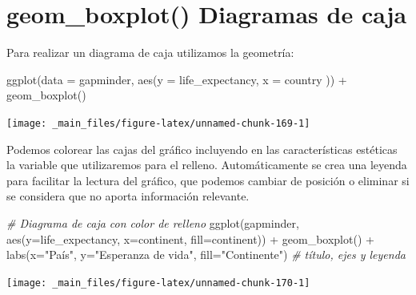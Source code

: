 \documentclass[
]{book}
\newenvironment{Shaded}{\begin{snugshade}}{\end{snugshade}}
\newcommand{\AttributeTok}[1]{\textcolor[rgb]{0.77,0.63,0.00}{#1}}
\newcommand{\CommentTok}[1]{\textcolor[rgb]{0.56,0.35,0.01}{\textit{#1}}}
\newcommand{\FunctionTok}[1]{\textcolor[rgb]{0.00,0.00,0.00}{#1}}
\newcommand{\NormalTok}[1]{#1}
\newcommand{\SpecialCharTok}[1]{\textcolor[rgb]{0.00,0.00,0.00}{#1}}
\newcommand{\StringTok}[1]{\textcolor[rgb]{0.31,0.60,0.02}{#1}}
\begin{document}
\hypertarget{geom_boxplot-diagramas-de-caja}{%
\section{geom\_boxplot() Diagramas de caja}\label{geom_boxplot-diagramas-de-caja}}

Para realizar un diagrama de caja utilizamos la geometría:

\begin{Shaded}
\begin{Highlighting}[]

\FunctionTok{ggplot}\NormalTok{(}\AttributeTok{data =}\NormalTok{ gapminder, }\FunctionTok{aes}\NormalTok{(}\AttributeTok{y =}\NormalTok{ life\_expectancy, }\AttributeTok{x =}\NormalTok{ country )) }\SpecialCharTok{+}
  \FunctionTok{geom\_boxplot}\NormalTok{()  }
\end{Highlighting}
\end{Shaded}

\begin{center}\texttt{[image: \_main\_files/figure-latex/unnamed-chunk-169-1]} \end{center}

Podemos colorear las cajas del gráfico incluyendo en las características estéticas la variable que utilizaremos para el relleno. Automáticamente se crea una leyenda para facilitar la lectura del gráfico, que podemos cambiar de posición o eliminar si se considera que no aporta información relevante.

\begin{Shaded}
\begin{Highlighting}[]
\CommentTok{\# Diagrama de caja con color de relleno}
\FunctionTok{ggplot}\NormalTok{(gapminder, }\FunctionTok{aes}\NormalTok{(}\AttributeTok{y=}\NormalTok{life\_expectancy, }\AttributeTok{x=}\NormalTok{continent, }\AttributeTok{fill=}\NormalTok{continent)) }\SpecialCharTok{+}
  \FunctionTok{geom\_boxplot}\NormalTok{() }\SpecialCharTok{+}
  \FunctionTok{labs}\NormalTok{(}\AttributeTok{x=}\StringTok{"País"}\NormalTok{, }\AttributeTok{y=}\StringTok{"Esperanza de vida"}\NormalTok{, }\AttributeTok{fill=}\StringTok{"Continente"}\NormalTok{)   }\CommentTok{\# título, ejes y leyenda}
\end{Highlighting}
\end{Shaded}

\begin{center}\texttt{[image: \_main\_files/figure-latex/unnamed-chunk-170-1]} \end{center}
\end{document}

